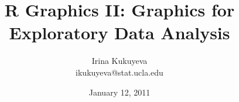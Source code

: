 \title{ \ttfamily R \normalfont Graphics II: Graphics for Exploratory Data Analysis}
\author{Irina Kukuyeva \\ \ttfamily ikukuyeva@stat.ucla.edu \normalfont}
\date{January 12, 2011}



\frame{ \titlepage }
